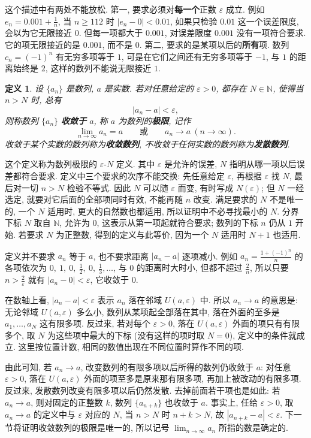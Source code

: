 \documentclass[UTF8,openany]{ctexbook}
\theoremstyle{chinesetextbook}
\newtheorem{definition}{定义}[section]
\begin{document}
这个描述中有两处不能放松. 第一, 要求必须对\textbf{每一个}正数 $\varepsilon$ 成立. 例如 $\displaystyle e_n=0.001+\frac1n$, 当 $n\ge112$ 时 $|e_n-0|<0.01$, 如果只检验 $0.01$ 这一个误差限度, 会以为它无限接近 $0$. 但每一项都大于 $0.001$, 对误差限度 $0.001$ 没有一项符合要求. 它的项无限接近的是 $0.001$, 而不是 $0$. 第二, 要求的是某项以后的\textbf{所有}项. 数列 $c_n=(-1)^n$ 有无穷多项等于 $1$, 可是在它们之间还有无穷多项等于 $-1$, 与 $1$ 的距离始终是 $2$, 这样的数列不能说无限接近 $1$.
\begin{definition}
设 $\{a_n\}$ 是数列, $a$ 是实数. 若对任意给定的 $\varepsilon>0$, 都存在 $N\in\mathbb N$, 使得当 $n>N$ 时, 总有
\[
|a_n-a|<\varepsilon,
\]
则称数列 $\{a_n\}$ \textbf{收敛于} $a$, 称 $a$ 为数列的\textbf{极限}, 记作
\[
\lim_{n\to\infty}a_n=a\qquad\text{或}\qquad a_n\to a\ (n\to\infty).
\]
收敛于某个实数的数列称为\textbf{收敛数列}, 不收敛于任何实数的数列称为\textbf{发散数列}.
\end{definition}
这个定义称为数列极限的 $\varepsilon$-$N$ 定义. 其中 $\varepsilon$ 是允许的误差, $N$ 指明从哪一项以后误差都符合要求. 定义中三个要求的次序不能交换: 先任意给定 $\varepsilon$, 再根据 $\varepsilon$ 找 $N$, 最后对一切 $n>N$ 检验不等式. 因此 $N$ 可以随 $\varepsilon$ 而变, 有时写成 $N(\varepsilon)$; 但 $N$ 一经选定, 就要对它后面的全部项同时有效, 不能再随 $n$ 改变. 满足要求的 $N$ 不是唯一的, 一个 $N$ 适用时, 更大的自然数也都适用, 所以证明中不必寻找最小的 $N$. 分界下标 $N$ 取自 $\mathbb N$, 允许为 $0$, 这表示从第一项起就符合要求; 数列的下标 $n$ 仍从 $1$ 开始. 若要求 $N$ 为正整数, 得到的定义与此等价, 因为一个 $N$ 适用时 $N+1$ 也适用.

定义并不要求 $a_n$ 等于 $a$, 也不要求距离 $|a_n-a|$ 逐项减小. 例如 $\displaystyle a_n=\frac{1+(-1)^n}n$ 的各项依次为 $\displaystyle0,\ 1,\ 0,\ \frac12,\ 0,\ \frac13,\ldots$, 与 $0$ 的距离时大时小, 但都不超过 $\displaystyle\frac2n$, 所以只要 $\displaystyle n>\frac2\varepsilon$ 就有 $|a_n-0|<\varepsilon$, 它收敛于 $0$.

在数轴上看, $|a_n-a|<\varepsilon$ 表示 $a_n$ 落在邻域 $U(a,\varepsilon)$ 中. 所以 $a_n\to a$ 的意思是: 无论邻域 $U(a,\varepsilon)$ 多么小, 数列从某项起全部落在其中, 落在外面的至多是 $a_1,\ldots,a_N$ 这有限多项. 反过来, 若对每个 $\varepsilon>0$, 落在 $U(a,\varepsilon)$ 外面的项只有有限多个, 取 $N$ 为这些项中最大的下标 (没有这样的项时取 $N=0$), 定义中的条件就成立. 这里按位置计数, 相同的数值出现在不同位置时算作不同的项.

由此可知, 若 $a_n\to a$, 改变数列的有限多项以后所得的数列仍收敛于 $a$: 对任意 $\varepsilon>0$, 落在 $U(a,\varepsilon)$ 外面的项至多是原来那有限多项, 再加上被改动的有限多项. 反过来, 发散数列改变有限多项以后仍然发散. 去掉前面若干项也是如此: 若 $a_n\to a$, 则对固定的正整数 $k$, 数列 $\{a_{n+k}\}$ 也收敛于 $a$. 事实上, 任给 $\varepsilon>0$, 取 $a_n\to a$ 的定义中与 $\varepsilon$ 对应的 $N$, 当 $n>N$ 时 $n+k>N$, 故 $|a_{n+k}-a|<\varepsilon$. 下一节将证明收敛数列的极限是唯一的, 所以记号 $\displaystyle\lim_{n\to\infty}a_n$ 所指的数是确定的.
\end{document}
